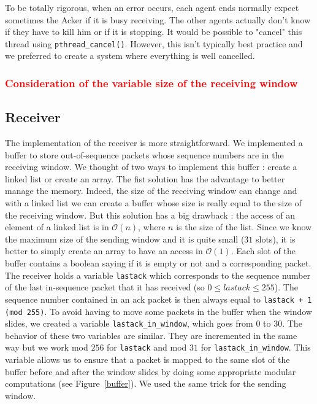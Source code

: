 \documentclass[11pt,a4paper]{article}
\begin{document}
To be totally rigorous, when an error occurs, each agent ends normally expect sometimes the Acker if it is busy receiving. The other agents actually don't know if they have to kill him or if it is stopping. It would be possible to "cancel" this thread using \texttt{pthread\_cancel()}. However, this isn't typically best practice and we preferred to create a system where everything is well cancelled.

\subsubsection{\textcolor{red}{Consideration of the variable size of the receiving window}}

\subsection{Receiver}
The implementation of the receiver is more straightforward. We implemented a buffer to store out-of-sequence packets whose sequence numbers are in the receiving window. We thought of two ways to implement this buffer : create a linked list or create an array. The fist solution has the advantage to better manage the memory. Indeed, the size of the receiving window can change and with a linked list we can create a buffer whose size is really equal to the size of the receiving window. But this solution has a big drawback : the access of an element of a linked list is in $\mathcal{O}(n)$, where $n$ is the size of the list. Since we know the maximum size of the sending window and it is quite small ($31$ slots), it is better to simply create an array to have an access in $\mathcal{O}(1)$. Each slot of the buffer contains a boolean saying if it is empty or not and a corresponding packet. The receiver holds a variable \texttt{lastack} which corresponds to the sequence number of the last in-sequence packet that it has received (so $0 \leq lastack \leq 255$). The sequence number contained in an ack packet is then always equal to \texttt{lastack + 1 (mod 255)}. To avoid having to move some packets in the buffer when the window slides, we created a variable \texttt{lastack\_in\_window}, which goes from $0$ to $30$. The behavior of these two variables are similar. They are incremented in the same way but we work mod $256$ for \texttt{lastack} and mod $31$ for \texttt{lastack\_in\_window}. This variable allows us to ensure that a packet is mapped to the same slot of the buffer before and after the window slides by doing some appropriate modular computations (see Figure~\ref{buffer}).  We used the same trick for the sending window.\\
\end{document}
